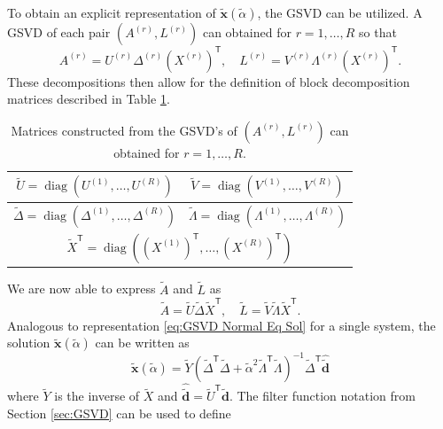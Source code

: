 \documentclass[12pt]{article}
\newcommand{\dVec}{\mathbf{d}}	%
\newcommand{\xVec}{\mathbf{x}}	%
\newcommand{\trans}[1]{{#1}^\mathsf{T}}	%
\newcommand{\inv}[1]{{#1}^{-1}}	%
\DeclareMathOperator{\diag}{diag}	%
\newcommand{\regparam}{\alpha}  %
\newcommand{\regparamBig}{\widetilde{\regparam}}   %
\newcommand{\xBig}{\widetilde{\xVec}}	%
\newcommand{\dBig}{\widetilde{\dVec}}	%
\newcommand{\ABig}{\widetilde{A}}	%
\newcommand{\LBig}{\widetilde{L}}	%
\newcommand{\svd}[1]{\widehat{#1}}	%
\begin{document}
To obtain an explicit representation of $\xBig(\regparamBig)$, the GSVD can be utilized. A GSVD of each pair $(A^{(r)},L^{(r)})$ can obtained for $r = 1,\ldots,R$ so that
\begin{equation}
\label{eq:Mulitple GSVD}
    A^{(r)} = U^{(r)}\Delta^{(r)}\trans{\left(X^{(r)}\right)}, \quad L^{(r)} = V^{(r)}\Lambda^{(r)}\trans{\left(X^{(r)}\right)}.
\end{equation}
These decompositions then allow for the definition of block decomposition matrices described in Table \ref{tab:Block GSVD Matrices}.
\begin{table}[ht!]
  \begin{center}
    \caption{Matrices constructed from the GSVD's of $(A^{(r)},L^{(r)})$ can obtained for $r = 1,\ldots,R$.}
    \label{tab:Block GSVD Matrices}
    \begin{tabular}{|c|c|}
    \hline
    $\widetilde{U} = \diag\left(U^{(1)},\ldots,U^{(R)}\right)$ & $\widetilde{V} = \diag\left(V^{(1)},\ldots,V^{(R)}\right)$ \\
    \hline
    $\widetilde{\Delta} = \diag\left(\Delta^{(1)},\ldots,\Delta^{(R)}\right)$ & $\widetilde{\Lambda} = \diag\left(\Lambda^{(1)},\ldots,\Lambda^{(R)}\right)$ \\
    \hline
    \multicolumn{2}{|c|}{$\trans{\widetilde{X}} = \diag\left(\trans{\left(X^{(1)}\right)},\ldots,\trans{\left(X^{(R)}\right)}\right)$} \\
    \hline
    \end{tabular}
  \end{center}
\end{table}
We are now able to express $\ABig$ and $\LBig$ as
\begin{equation}
    \label{eq:Adapted A and L GSVD}
    \ABig = \widetilde{U}\widetilde{\Delta}\trans{\widetilde{X}}, \quad \LBig = \widetilde{V}\widetilde{\Lambda}\trans{\widetilde{X}}.
\end{equation}
Analogous to representation \eqref{eq:GSVD Normal Eq Sol} for a single system, the solution $\xBig(\regparamBig)$ can be written as 
\begin{equation}
    \label{eq:GSVD Big Normal Eq Sol}
    \xBig(\regparamBig) = \widetilde{Y}\inv{\left(\trans{\widetilde{\Delta}}\widetilde{\Delta} + \widetilde{\regparam}^2 \trans{\widetilde{\Lambda}}\widetilde{\Lambda}\right)}\trans{\widetilde{\Delta}}\svd{\dBig}
\end{equation}
where $\widetilde{Y}$ is the inverse of $\widetilde{X}$ and $\svd{\dBig} = \trans{\widetilde{U}}\dBig$. The filter function notation from Section \ref{sec:GSVD} can be used to define
\end{document}
